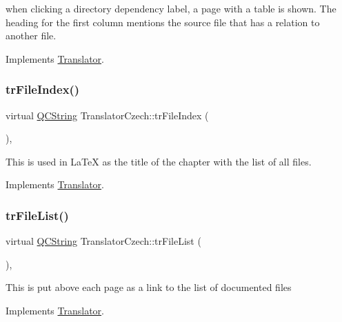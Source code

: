 when clicking a directory dependency label, a page with a table is shown. The heading for the first column mentions the source file that has a relation to another file. 

Implements \mbox{\hyperlink{class_translator}{Translator}}.

\mbox{\label{class_translator_czech_af5accc6790089439b604a76e635d1b9d}} 
\subsubsection{\texorpdfstring{trFileIndex()}{trFileIndex()}}
{\footnotesize\ttfamily virtual \mbox{\hyperlink{class_q_c_string}{Q\+C\+String}} Translator\+Czech\+::tr\+File\+Index (\begin{DoxyParamCaption}{ }\end{DoxyParamCaption})\hspace{0.3cm}{\ttfamily [inline]}, {\ttfamily [virtual]}}

This is used in La\+TeX as the title of the chapter with the list of all files. 

Implements \mbox{\hyperlink{class_translator}{Translator}}.

\mbox{\label{class_translator_czech_a760894cd0e71c882e5bea9d752ad8ca8}} 
\subsubsection{\texorpdfstring{trFileList()}{trFileList()}}
{\footnotesize\ttfamily virtual \mbox{\hyperlink{class_q_c_string}{Q\+C\+String}} Translator\+Czech\+::tr\+File\+List (\begin{DoxyParamCaption}{ }\end{DoxyParamCaption})\hspace{0.3cm}{\ttfamily [inline]}, {\ttfamily [virtual]}}

This is put above each page as a link to the list of documented files 

Implements \mbox{\hyperlink{class_translator}{Translator}}.

\mbox{\label{class_translator_czech_a1097379b42a50377bf50a2d108abdf85}} 
